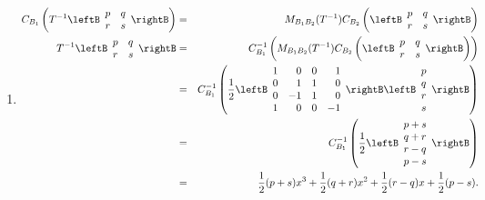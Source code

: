 \begin{solution}
\begin{enumerate}
\item 
\begin{eqnarray*}
C_{B_1}\left(T^{-1}\leftB\begin{array}{cc}
p & q \\ r & s \end{array}\rightB\right) & = & 
M_{B_1B_2}(T^{-1})
C_{B_2}\left( \leftB\begin{array}{cc}
p & q \\ r & s \end{array}\rightB\right)\\
T^{-1}\leftB\begin{array}{cc}
p & q \\ r & s \end{array}\rightB & = & 
C_{B_1}^{-1}\left(M_{B_1B_2}(T^{-1})
C_{B_2}\left( \leftB\begin{array}{cc}
p & q \\ r & s \end{array}\rightB\right)\right)\\
& = &
C_{B_1}^{-1}\left(
\frac{1}{2}\leftB\begin{array}{rrrr}
1 & 0 & 0 & 1 \\
0 & 1 & 1 & 0 \\
0 & -1 & 1 & 0 \\
1 & 0 & 0 & -1 \end{array}\rightB
\leftB\begin{array}{c} p \\ q\\ r\\ s\end{array}\rightB\right) \\
& =&
C_{B_1}^{-1}\left(\frac{1}{2}\leftB\begin{array}{c}
p+s \\ q+r \\ r-q \\ p-s \end{array}\rightB\right) \\
& = & \frac{1}{2}(p+s)x^3 +\frac{1}{2}(q+r)x^2 +\frac{1}{2}(r-q)x 
+ \frac{1}{2}(p-s).
\end{eqnarray*}
\end{enumerate}
\end{solution}